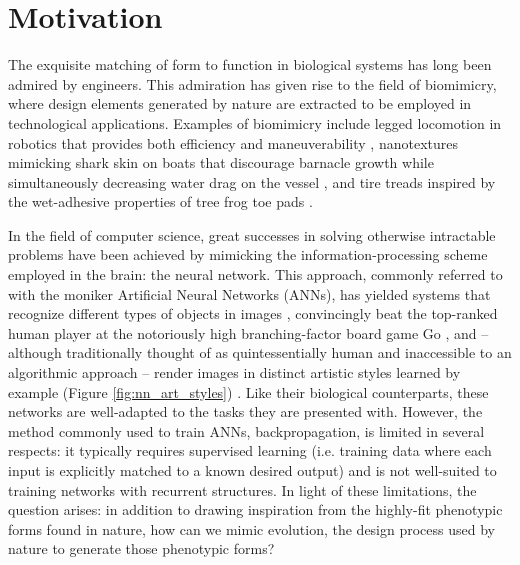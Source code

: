 \section{Motivation} \label{sec:motivation}
The exquisite matching of form to function in biological systems has long been admired by engineers. This admiration has given rise to the field of biomimicry, where design elements generated by nature are extracted to be employed in technological applications. Examples of biomimicry include legged locomotion in robotics that provides both efficiency and maneuverability \cite{Grimes2012THE}, nanotextures mimicking shark skin on boats that discourage barnacle growth while simultaneously decreasing water drag on the vessel \cite{Stenzel2011Drag-reducingShipping}, and tire treads inspired by the wet-adhesive properties of tree frog toe pads \cite{Persson2007WetTires}.

In the field of computer science, great successes in solving otherwise intractable problems have been achieved by mimicking the information-processing scheme employed in the brain: the neural network. This approach, commonly referred to with the moniker Artificial Neural Networks (ANNs), has yielded systems that recognize different types of objects in images \cite{KrizhevskyImageNetNetworks}, convincingly beat the top-ranked human player at the notoriously high branching-factor board game Go \cite{Silver2016MasteringSearch}, and -- although traditionally thought of as quintessentially human and inaccessible to an algorithmic approach -- render images in distinct artistic styles learned by example (Figure \ref{fig:nn_art_styles}) \cite{Gatys2015AStyle}. Like their biological counterparts, these networks are well-adapted to the tasks they are presented with. However, the method commonly used to train ANNs, backpropagation, is limited in several respects: it typically requires supervised learning (i.e. training data where each input is explicitly matched to a known desired output) and is not well-suited to training networks with recurrent structures. In light of these limitations, the question arises: in addition to drawing inspiration from the highly-fit phenotypic forms found in nature, how can we mimic evolution, the design process used by nature to generate those phenotypic forms?

